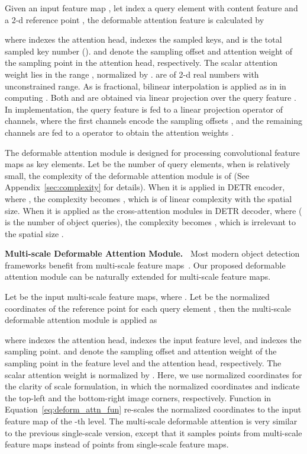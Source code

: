 \documentclass{article}
\begin{document}
Given an input feature map , let  index a query element with content feature  and a 2-d reference point , the deformable attention feature is calculated by

where  indexes the attention head,  indexes the sampled keys, and  is the total sampled key number ().
 and  denote the sampling offset and attention weight of the  sampling point in the  attention head, respectively.
The scalar attention weight  lies in the range , normalized by .  are of 2-d real numbers with unconstrained range. As  is
fractional, bilinear interpolation is applied as in \citet{dai2017deformable} in computing . 
Both  and  are obtained via linear projection over the query feature . In implementation, the query feature  is fed to a linear projection operator of  channels, where the first  channels encode the sampling offsets , and the remaining  channels are fed to a  operator to obtain the attention weights .

The deformable attention module is designed for processing convolutional feature maps as key elements. Let  be the number of query elements, when  is relatively small, the complexity of the deformable attention module is of  (See Appendix~\ref{sec:complexity} for details). When it is applied in DETR encoder, where , the complexity becomes , which is of linear complexity with the spatial size. When it is applied as the  cross-attention modules in DETR decoder, where  ( is the number of object queries), the complexity becomes , which is irrelevant to the spatial size .

\textbf{Multi-scale Deformable Attention Module.~}
Most modern object detection frameworks benefit from multi-scale feature maps~\citep{liu2020deep}. Our proposed deformable attention module can be naturally extended for multi-scale feature maps.

Let  be the input multi-scale feature maps, where . Let  be the normalized coordinates of the reference point for each query element , then the multi-scale deformable attention module is applied as

where  indexes the attention head,  indexes the input feature level, and  indexes the sampling point.
 and  denote the sampling offset and attention weight of the  sampling point in the  feature level and the  attention head, respectively.
The scalar attention weight  is normalized by .
Here, we use normalized coordinates  for the clarity of scale formulation, in which the normalized coordinates  and  indicate the top-left and the bottom-right image corners, respectively. Function  in Equation~\ref{eq:deform_attn_fun} re-scales the normalized coordinates  to the input feature map of the -th level. The multi-scale deformable attention is very similar to the previous single-scale version, except that it samples  points from multi-scale feature maps instead of  points from single-scale feature maps.
\end{document}
